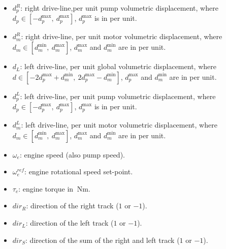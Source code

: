 \documentclass[12pt,a4paper,oneside]{book}
\begin{document}
\begin{onehalfspace}
\begin{itemize}
	\item[--] $d_p^R$: right drive-line,per unit pump volumetric displacement, where $d_p   \in [-d_p^\text{max},\ d_p^\text{max}]$, $d_p^\text{max}$ is in per unit.
	\item[--] $d_m^R$: right drive-line, per unit motor volumetric displacement, where $d_m\in [d_m^\text{min},\ d_m^\text{max}]$, $d_m^\text{max}$ and $d_m^\text{min}$ are in per unit.
	\item[--] $d_L$: left drive-line, per unit global volumetric displacement, where $d\in [-2d_p^\text{max}+d_m^\text{min},\ 2d_p^\text{max}-d_m^\text{min}]$, $d_p^\text{max}$ and $d_m^\text{min}$ are in per unit.
	\item[--] $d_p^L$: left drive-line, per unit pump volumetric displacement, where $d_p\in [-d_p^\text{max},\ d_p^\text{max}]$, $d_p^\text{max}$ is in per unit.
	\item[--] $d_m^L$: left drive-line, per unit motor volumetric displacement, where $d_m\in [d_m^\text{min},\ d_m^\text{max}]$, $d_m^\text{max}$ and $d_m^\text{min}$ are in per unit.
	\item[--] $\omega_e$: engine speed (also pump speed).
	\item[--] $\omega_e^{ref}$: engine rotational speed set-point.
	\item[--] $\tau_e$: engine torque in $\SI{}{\newton\meter}$.
	\item[--] $dir_R$: direction of the right track ($1$ or $-1$).
	\item[--] $dir_L$: direction of the left track ($1$ or $-1$).
	\item[--] $dir_S$: direction of the sum of the right and left track ($1$ or $-1$).
\end{itemize}


\end{onehalfspace}
\end{document}
